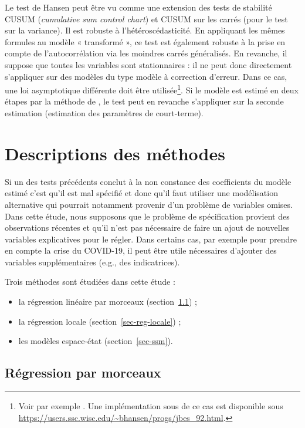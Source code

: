 \documentclass[
  a4paper,
  DIV=11,
  numbers=noendperiod,
  french]{scrartcl}
\newcommand\1{{\mathds 1}}
\theoremstyle{remark}
\begin{document}
Le test de Hansen peut être vu comme une extension des tests de
stabilité CUSUM (\emph{cumulative sum control chart}) et CUSUM sur les
carrés (pour le test sur la variance). Il est robuste à
l'hétéroscédasticité. En appliquant les mêmes formules au modèle «
transformé », ce test est également robuste à la prise en compte de
l'autocorrélation via les moindres carrés généralisés. En revanche, il
suppose que toutes les variables sont stationnaires : il ne peut donc
directement s'appliquer sur des modèles du type modèle à correction
d'erreur. Dans ce cas, une loi asymptotique différente doit être
utilisée\footnote{ Voir par exemple \textcite{hansen1992I1}. Une
  implémentation sous  de ce cas est disponible sous
  \url{https://users.ssc.wisc.edu/~bhansen/progs/jbes_92.html}.}. Si le
modèle est estimé en deux étapes par la méthode de
\textcite{engle1987co}, le test peut en revanche s'appliquer sur la
seconde estimation (estimation des paramètres de court-terme).

\section{Descriptions des méthodes}\label{sec-desc-meth}

Si un des tests précédents conclut à la non constance des coefficients
du modèle estimé c'est qu'il est mal spécifié et donc qu'il faut
utiliser une modélisation alternative qui pourrait notamment provenir
d'un problème de variables omises. Dans cette étude, nous supposons que
le problème de spécification provient des observations récentes et qu'il
n'est pas nécessaire de faire un ajout de nouvelles variables
explicatives pour le régler. Dans certains cas, par exemple pour prendre
en compte la crise du COVID-19, il peut être utile nécessaires d'ajouter
des variables supplémentaires (e.g., des indicatrices).

Trois méthodes sont étudiées dans cette étude :

\begin{itemize}
\item
  la régression linéaire par morceaux (section~\ref{sec-reg-morceaux}) ;
\item
  la régression locale (section~\ref{sec-reg-locale}) ;
\item
  les modèles espace-état (section~\ref{sec-ssm}).
\end{itemize}

\subsection{Régression par morceaux}\label{sec-reg-morceaux}
\end{document}
